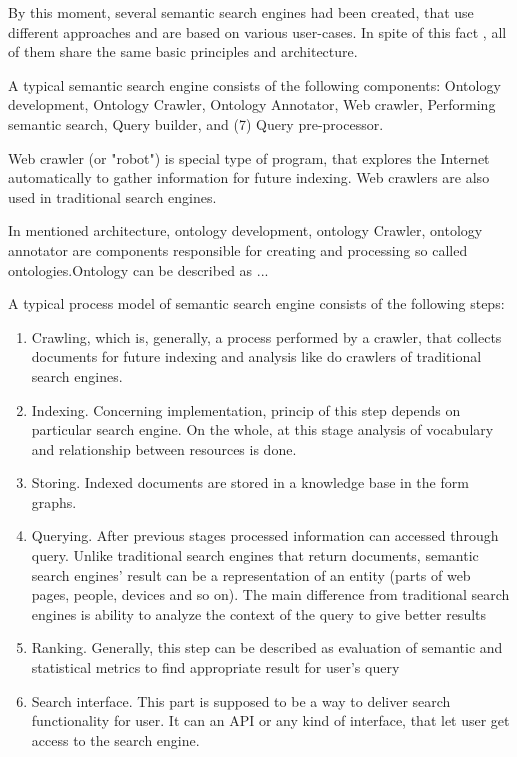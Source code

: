 \documentclass[10pt,twoside,a4paper]{article}
\begin{document}
By this moment, several semantic search engines had been created, that use different approaches and are based on various user-cases. In spite of this fact , all of them share the same basic principles and architecture.



A typical semantic search engine consists of the following components:  Ontology development,  Ontology Crawler,  Ontology Annotator,  Web crawler,  Performing semantic search, Query builder, and (7) Query pre-processor. 

Web crawler (or "robot") is special type of program, that explores the Internet automatically to gather information for future indexing. Web crawlers are also used in traditional search engines.

In mentioned architecture,  ontology development,  ontology Crawler,  ontology annotator are components responsible for creating and processing so called ontologies.Ontology can be described as ... 



\cite{intonw}



A typical process model of semantic search engine consists of the following steps:
\begin{enumerate}
    \item Crawling, which is, generally, a process performed by a crawler, that collects documents for future indexing and analysis like do crawlers of traditional search engines.
    \item Indexing. Concerning implementation, princip of this step depends on particular search engine. On the whole, at this stage analysis of vocabulary and relationship between resources is done.
    \item Storing. Indexed documents are stored in a knowledge base in the form graphs.
    \item Querying. After previous stages processed information can accessed through query. Unlike traditional search engines that return documents, semantic search engines' result can be a representation of an entity (parts of web pages, people, devices and so on). The main difference from traditional search engines is ability to analyze the context of the query to give better results
    \item Ranking. Generally, this step can be described as evaluation of semantic and statistical metrics to find appropriate result for user's query
    \item Search interface. This part is supposed to be  a way to deliver search functionality for user. It can an API  or any kind of interface, that let user get access to the search engine.

    
\end{enumerate}
\end{document}

